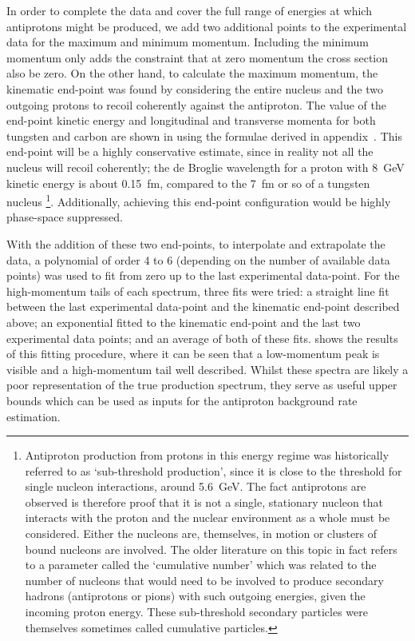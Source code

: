 \FigAntiprotonEndpoint
In order to complete the data and cover the full range of energies at which antiprotons might be produced, we add two additional points to the experimental data for the maximum and minimum momentum.
Including the minimum momentum only adds the constraint that at zero momentum the cross section also be zero.
On the other hand, to calculate the maximum momentum, the kinematic end-point was found by considering the entire nucleus and the two outgoing protons to recoil coherently against the antiproton.
The value of the end-point kinetic energy and longitudinal and transverse momenta for both tungsten and carbon are shown in  using the formulae derived in appendix~.
This end-point will be a highly conservative estimate, since in reality not all the nucleus will recoil coherently;  the de Broglie wavelength for a proton with 8~GeV kinetic energy is about 0.15~fm, compared to the 7~fm or so of a tungsten nucleus%
\footnote{Antiproton production from protons in this energy regime was historically referred to as `sub-threshold production', since it is close to the threshold for single nucleon interactions, around 5.6~GeV.
The fact antiprotons are observed is therefore proof that it is not a single, stationary nucleon that interacts with the proton and the nuclear environment as a whole must be considered.
Either the nucleons are, themselves, in motion or clusters of bound nucleons are involved.
  The older literature on this topic in fact refers to a parameter called the `cumulative number' which was related to the number of nucleons that would need to be involved to produce secondary hadrons (\eg antiprotons or pions) with such outgoing energies, given the incoming proton energy.  
These sub-threshold secondary particles were themselves sometimes called cumulative particles.}.
Additionally, achieving this end-point configuration would be highly phase-space suppressed.

\FigAntiprotonFits
With the addition of these two end-points, to interpolate and extrapolate the data, a polynomial of order 4 to 6 (depending on the number of available data points) was used to fit from zero up to the last experimental data-point.
For the high-momentum tails of each spectrum, three fits were tried: a straight line fit between the last experimental data-point and the kinematic end-point described above; an exponential fitted to the kinematic end-point and the last two experimental data points; and an average of both of these fits.
 shows the results of this fitting procedure, where it can be seen that a low-momentum peak is visible and a high-momentum tail well described.
Whilst these spectra are likely a poor representation of the true production spectrum, they serve as useful upper bounds which can be used as inputs for the antiproton background rate estimation.


